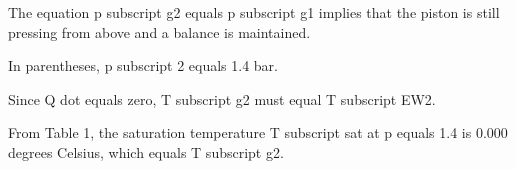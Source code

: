 The equation p subscript g2 equals p subscript g1 implies that the piston is still pressing from above and a balance is maintained.

In parentheses, p subscript 2 equals 1.4 bar.

Since Q dot equals zero, T subscript g2 must equal T subscript EW2.

From Table 1, the saturation temperature T subscript sat at p equals 1.4 is 0.000 degrees Celsius, which equals T subscript g2.